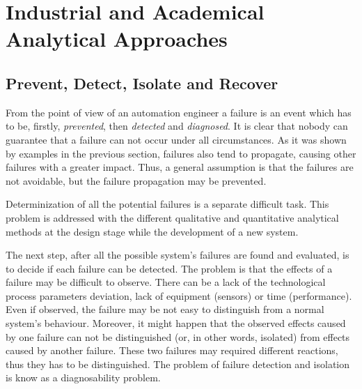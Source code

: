 \section{Industrial and Academical Analytical Approaches}



\subsection{Prevent, Detect, Isolate and Recover}

From the point of view of an automation engineer a failure is an event which has
to be, firstly, \emph{prevented}, then \emph{detected} and \emph{diagnosed}.
It is clear that nobody can guarantee that a failure can not occur under all
circumstances. As it was shown by examples in the previous section, failures
also tend to propagate, causing other failures with a greater impact.
Thus, a general assumption is that the failures are not avoidable, but the
failure propagation may be prevented.

Determinization of all the potential failures is a separate difficult task.
This problem is addressed with the different qualitative and quantitative 
analytical methods at the design stage while the development of a new system.

The next step, after all the possible system's failures are found and
evaluated, is to decide if each failure can be detected. The problem is that the
effects of a failure may be difficult to observe. There can be a lack of
the technological process parameters deviation, lack of equipment (sensors) or
time (performance). Even if observed, the failure may be not easy to distinguish
from a normal system's behaviour. Moreover, it might happen that the
observed effects caused by one failure can not be distinguished (or, in other
words, isolated) from effects caused by another failure. These two failures may
required different reactions, thus they has to be distinguished. The problem of
failure detection and isolation is know as a diagnosability problem.


